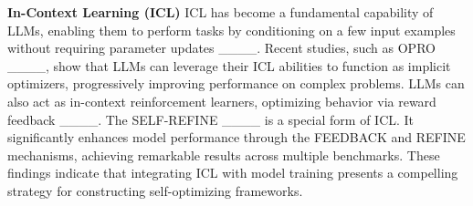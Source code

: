 \textbf{In-Context Learning (ICL)} 
ICL has become a fundamental capability of LLMs, enabling them to perform tasks by conditioning on a few input examples without requiring parameter updates ____. Recent studies, such as OPRO ____, show that LLMs can leverage their ICL abilities to function as implicit optimizers, progressively improving performance on complex problems. LLMs can also act as in-context reinforcement learners, optimizing behavior via reward feedback ____. The SELF-REFINE ____ is a special form of ICL. It significantly enhances model performance through the FEEDBACK and REFINE mechanisms, achieving remarkable results across multiple benchmarks. 
These findings indicate that integrating ICL with model training presents a compelling strategy for constructing self-optimizing frameworks.